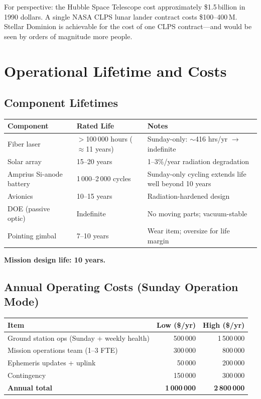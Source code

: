 \documentclass[12pt,letterpaper]{article}
\begin{document}
\medskip
\noindent For perspective: the Hubble Space Telescope cost approximately
\$1.5\,billion in 1990 dollars. A single NASA CLPS lunar lander contract
costs \$100--400\,M. Stellar Dominion is achievable for the cost of one CLPS
contract---and would be seen by orders of magnitude more people.

\section{Operational Lifetime and Costs}

\subsection{Component Lifetimes}

\begin{center}
\begin{tabular}{llp{5.5cm}}
\toprule
\textbf{Component} & \textbf{Rated Life} & \textbf{Notes} \\
\midrule
Fiber laser & $>$100\,000 hours ($\approx$11 years) & Sunday-only: $\sim$416 hrs/yr $\to$ indefinite \\
Solar array & 15--20 years & 1--3\%/year radiation degradation \\
Amprius Si-anode battery & 1\,000--2\,000 cycles & Sunday-only cycling extends life well beyond 10 years \\
Avionics & 10--15 years & Radiation-hardened design \\
DOE (passive optic) & Indefinite & No moving parts; vacuum-stable \\
Pointing gimbal & 7--10 years & Wear item; oversize for life margin \\
\bottomrule
\end{tabular}
\end{center}

\textbf{Mission design life: 10 years.}

\subsection{Annual Operating Costs (Sunday Operation Mode)}

\begin{center}
\begin{tabular}{lrr}
\toprule
\textbf{Item} & \textbf{Low (\$/yr)} & \textbf{High (\$/yr)} \\
\midrule
Ground station ops (Sunday + weekly health) & 500\,000 & 1\,500\,000 \\
Mission operations team (1--3 FTE) & 300\,000 & 800\,000 \\
Ephemeris updates + uplink & 50\,000 & 200\,000 \\
Contingency & 150\,000 & 300\,000 \\
\midrule
\textbf{Annual total} & \textbf{1\,000\,000} & \textbf{2\,800\,000} \\
\bottomrule
\end{tabular}
\end{center}
\end{document}
